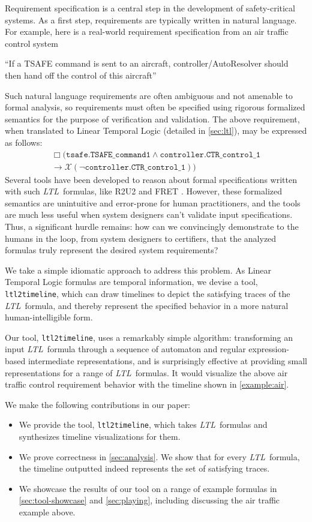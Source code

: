 \documentclass[preprint,12pt]{elsarticle}
\theoremstyle{definition}
\theoremstyle{remark}
\newcommand{\always}{\Box}
\newcommand{\nextt}{\mathcal{X}}
\newcommand{\limplies}{\rightarrow}
\newcommand{\ltl}{\textit{LTL}}
\newcommand{\tool}{\hspace{0.1cm}\texttt{ltl2timeline}\hspace{0.1cm}}
\begin{document}
Requirement specification is a central step in the development of safety-critical systems. As a first step, requirements are typically written in natural language. For example, here is a real-world requirement specification from an air traffic control system ~\cite{ZR14}
\begin{center}
    ``If a TSAFE command is sent to an aircraft, controller/AutoResolver should then hand off the control of this aircraft''
\end{center}
Such natural language requirements are often ambiguous and not amenable to formal analysis, so requirements must often be specified using rigorous formalized semantics for the purpose of verification and validation. The above requirement, when translated to Linear Temporal Logic (detailed in \cref{sec:ltl}), may be expressed as follows:
\begin{align*}
    \always (\texttt{tsafe.TSAFE\_command1} \land \texttt{controller.CTR\_control\_1} \\
    \limplies \nextt (\neg \texttt{controller.CTR\_control\_1}))
\end{align*}
Several tools have been developed to reason about formal specifications written with such \ltl\ formulas, like R2U2 and FRET \cite{GPMS20}. However, these formalized semantics are unintuitive and error-prone for human practitioners, and the tools are much less useful when system designers can't validate input specifications.
Thus, a significant hurdle remains: how can we convincingly demonstrate to the humans in the loop, from system designers to certifiers, that the analyzed formulas truly represent the desired system requirements? %

We take a simple idiomatic approach to address this problem. As Linear Temporal Logic formulas are temporal information, we devise a tool, \tool, which can draw timelines to depict the satisfying traces of the \ltl\ formula, and thereby represent the specified behavior in a more natural human-intelligible form.

Our tool, \tool, uses a remarkably simple algorithm: transforming an input \ltl\ formula through a sequence of automaton and regular expression-based intermediate representations, and is surprisingly effective at providing small representations for a range of \ltl\ formulas. It would visualize the above air traffic control requirement behavior with the timeline shown in \cref{example:air}.

We make the following contributions in our paper:
\begin{itemize}
    \item We provide the tool, \tool, which takes \ltl\ formulas and synthesizes timeline visualizations for them.
    \item We prove correctness in \cref{sec:analysis}. We show that for every \ltl\ formula, the timeline outputted indeed represents the set of satisfying traces.
    \item We showcase the results of our tool on a range of example formulas in \cref{sec:tool-showcase} and \cref{sec:playing}, including discussing the air traffic example above.
\end{itemize}
\end{document}
